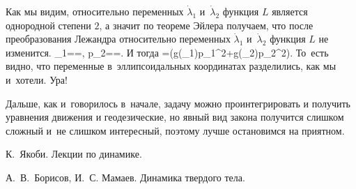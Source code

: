 \documentclass[a4paper,11pt]{article}
\def\[#1\]{\begin{align*}#1\end{align*}}
\begin{document}
Как мы видим, относительно переменных $\dot\lambda_1$ и~$\dot\lambda_2$
функция $L$ является однородной степени $2$, а значит по теореме Эйлера
получаем, что после преобразования Лежандра относительно переменных
$\dot\lambda_1$ и~$\dot\lambda_2$ функция $L$ не изменится.
	\[
	p_1==,
	\quad
	p_2==.
	\]
И тогда
	\[
	H=(g(\lambda_1)p_1^2+g(\lambda_2)p_2^2).
	\]
То~есть видно, что переменные в~эллипсоидальных координатах разделились, как мы
и~хотели. Ура!

Дальше, как и~говорилось в~начале, задачу можно проинтегрировать и получить
уравнения движения и геодезические, но явный вид закона получится слишком
сложный и~не слишком интересный, поэтому лучше остановимся на приятном.


\begin{thebibliography}{9}
\bibitem{}
К.~Якоби. Лекции по динамике.

\bibitem{}
А.~В.~Борисов, И.~С. Мамаев. Динамика твердого тела.
\end{thebibliography}
\end{document}
